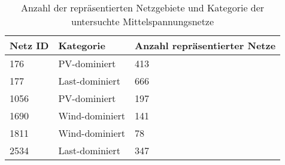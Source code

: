 {
\renewcommand{\arraystretch}{1.2}%
\begin{table}[H]
	\begin{center}
		\caption{Anzahl der repräsentierten Netzgebiete und Kategorie der untersuchte Mittelspannungsnetze}
		\begin{tabu} to \textwidth {X[1] X[1] X[1, r] }
			\hline
			Netz ID    & Kategorie      & Anzahl repräsentierter Netze \\ \hline
			\num{176}  & PV-dominiert   & \num{413}                    \\
			\num{177}  & Last-dominiert & \num{666}                    \\
			\num{1056} & PV-dominiert   & \num{197}                    \\
			\num{1690} & Wind-dominiert & \num{141}                    \\
			\num{1811} & Wind-dominiert & \num{78}                     \\
			\num{2534} & Last-dominiert & \num{347}                    \\ \hline
		\end{tabu}
		\label{tab:grid_IDs}
	\end{center}
	\vspace{-3mm}%
\end{table}
}